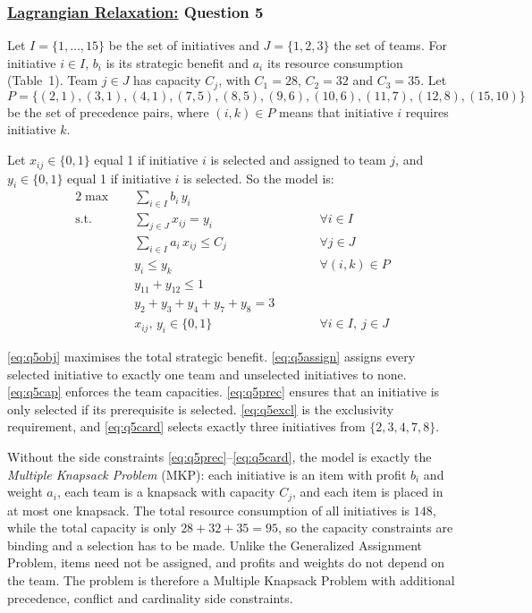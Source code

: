 \subsubsection*{\underline{Lagrangian Relaxation:} Question 5 }

Let $I = \{1,\dots,15\}$ be the set of initiatives and $J = \{1,2,3\}$ the set
of teams. For initiative $i \in I$, $b_i$ is its strategic benefit and $a_i$
its resource consumption (Table~1). Team $j \in J$ has capacity $C_j$, with
$C_1 = 28$, $C_2 = 32$ and $C_3 = 35$. Let
\[
P = \{(2,1),(3,1),(4,1),(7,5),(8,5),(9,6),(10,6),(11,7),(12,8),(15,10)\}
\]
be the set of precedence pairs, where $(i,k) \in P$ means that initiative $i$
requires initiative $k$.

Let $x_{ij} \in \{0,1\}$ equal 1 if initiative $i$ is selected and assigned to team $j$, and $y_i \in \{0,1\}$ equal 1 if initiative $i$ is selected. So the model is:
\begin{alignat}{2}
\max \quad & \sum_{i \in I} b_i\, y_i && \label{eq:q5obj}\\
\text{s.t.} \quad
& \sum_{j \in J} x_{ij} = y_i && \qquad \forall i \in I \label{eq:q5assign}\\
& \sum_{i \in I} a_i\, x_{ij} \le C_j && \qquad \forall j \in J \label{eq:q5cap}\\
& y_i \le y_k && \qquad \forall (i,k) \in P \label{eq:q5prec}\\
& y_{11} + y_{12} \le 1 && \label{eq:q5excl}\\
& y_2 + y_3 + y_4 + y_7 + y_8 = 3 && \label{eq:q5card}\\
& x_{ij},\, y_i \in \{0,1\} && \qquad \forall i \in I,\ j \in J \label{eq:q5dom}
\end{alignat}

\eqref{eq:q5obj} maximises the total strategic benefit. \eqref{eq:q5assign}
assigns every selected initiative to exactly one team and unselected
initiatives to none. \eqref{eq:q5cap} enforces the team capacities.
\eqref{eq:q5prec} ensures that an initiative is only selected if its
prerequisite is selected. \eqref{eq:q5excl} is the exclusivity requirement, and
\eqref{eq:q5card} selects exactly three initiatives from $\{2,3,4,7,8\}$.

Without the side constraints \eqref{eq:q5prec}--\eqref{eq:q5card}, the model is
exactly the \emph{Multiple Knapsack Problem} (MKP): each initiative is an item
with profit $b_i$ and weight $a_i$, each team is a knapsack with capacity
$C_j$, and each item is placed in at most one knapsack. The total resource
consumption of all initiatives is $148$, while the total capacity is only
$28 + 32 + 35 = 95$, so the capacity constraints are binding and a selection
has to be made. Unlike the Generalized Assignment Problem, items need not be
assigned, and profits and weights do not depend on the team. The problem is
therefore a Multiple Knapsack Problem with additional precedence, conflict and
cardinality side constraints.



